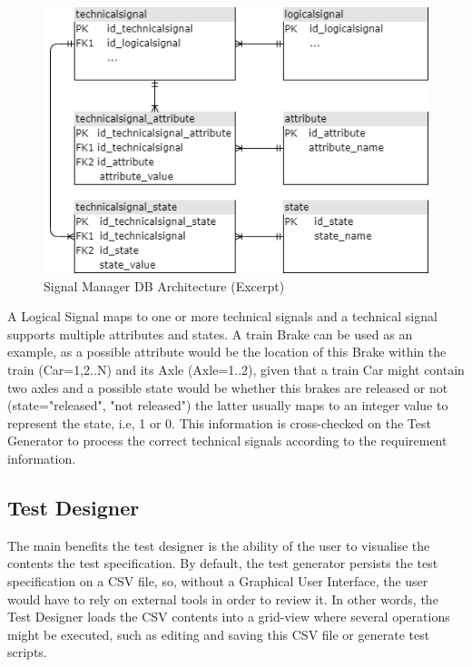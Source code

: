 \begin{figure}[H]
    \centering
    \includegraphics[scale=0.7]{images/signal_manager.png}
    \caption{Signal Manager DB Architecture (Excerpt)}
    \label{fig:db_signal_manager}
\end{figure}

A Logical Signal maps to one or more technical signals and a technical signal supports multiple attributes and states. A train Brake can be used as an example, as a possible attribute would be the location of this Brake within the train (Car=1,2..N) and its Axle (Axle=1..2), given that a train Car might contain two axles and a possible state would be whether this brakes are released or not (state="released", "not released") the latter usually maps to an integer value to represent the state, i.e, 1 or 0. This information is cross-checked on the Test Generator to process the correct technical signals according to the requirement information.


\subsection{Test Designer}
\label{subsec:method_test_designer}

The main benefits the test designer is the ability of the user to visualise the contents the test specification. By default, the test generator persists the test specification on a CSV file, so, without a Graphical User Interface, the user would have to rely on external tools in order to review it. In other words, the Test Designer loads the CSV contents into a grid-view where several operations might be executed, such as editing and saving this CSV file or generate test scripts.
